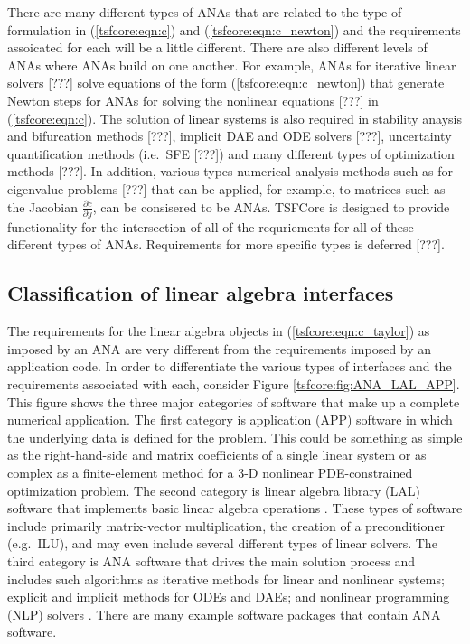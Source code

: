 \documentclass[10pt,fleqn]{article}
\begin{document}
There are many different types of ANAs that are related to the type of
formulation in (\ref{tsfcore:eqn:c}) and (\ref{tsfcore:eqn:c_newton})
and the requirements assoicated for each will be a little different.
There are also different levels of ANAs where ANAs build on one
another.  For example, ANAs for iterative linear solvers [???] solve
equations of the form (\ref{tsfcore:eqn:c_newton}) that generate
Newton steps for ANAs for solving the nonlinear equations [???] in
(\ref{tsfcore:eqn:c}).  The solution of linear systems is also
required in stability anaysis and bifurcation methods [???], implicit
DAE and ODE solvers [???], uncertainty quantification methods
(i.e.~SFE [???]) and many different types of optimization methods
[???].  In addition, various types numerical analysis methods such as
for eigenvalue problems [???] that can be applied, for example, to
matrices such as the Jacobian $\frac{\partial c}{\partial y}$, can be
consisered to be ANAs.  TSFCore is designed to provide functionality
for the intersection of all of the requriements for all of these
different types of ANAs.  Requirements for more specific types is
deferred [???].

%
\subsection{Classification of linear algebra interfaces}
\label{tsfcore:sec:classification_of_lin_alg_itfc}
%

The requirements for the linear algebra objects in
(\ref{tsfcore:eqn:c_taylor}) as imposed by
an ANA are very different from the requirements imposed by an
application code.  In order to differentiate the various types of
interfaces and the requirements associated with each, consider Figure
\ref{tsfcore:fig:ANA_LAL_APP}.  This figure shows the three major
categories of software that make up a complete numerical application.
The first category is application (APP) software in which the
underlying data is defined for the problem.  This could be something
as simple as the right-hand-side and matrix coefficients of a single
linear system or as complex as a finite-element method for a 3-D
nonlinear PDE-constrained optimization problem.  The second category
is linear algebra library (LAL) software that implements basic linear
algebra operations \cite{ref:demmel_1997,ref:anderson_1995,
ref:blackford_et_al_1997, ref:aztec, ref:petsc, ref:trilinos}. These
types of software include primarily matrix-vector multiplication, the
creation of a preconditioner (e.g.~ILU), and may even include several
different types of linear solvers.  The third category is ANA software
that drives the main solution process and includes such algorithms as
iterative methods for linear and nonlinear systems; explicit and
implicit methods for ODEs and DAEs; and nonlinear programming (NLP)
solvers \cite{ref:nocedal_wright_1999}.  There are many example
software packages
\cite{ref:petsc,ref:aztec,ref:trilinos,ref:pvode,ref:tao} that contain
ANA software.
\end{document}
